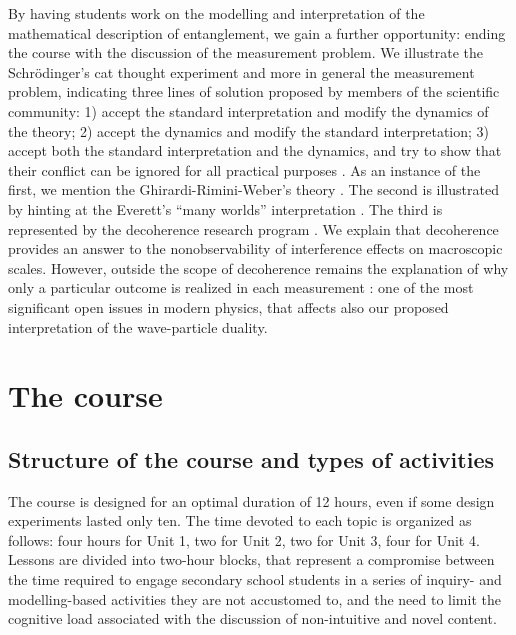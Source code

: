 \documentclass[twocolumn,secnumarabic,amssymb, nobibnotes, aps, prd, nofootinbib]{revtex4-2}
\begin{document}
By having students work on the modelling and interpretation of the mathematical description of entanglement, we gain a further opportunity: ending the course with the discussion of the measurement problem. We illustrate the Schr\"{o}dinger's cat thought experiment and more in general the measurement problem,
indicating three lines of solution proposed by members of the scientific community: 1) accept the standard interpretation and modify the dynamics of the theory; 2) accept the dynamics and modify the standard interpretation; 3) accept both the standard interpretation and the dynamics, and try to show that their conflict can be ignored for all practical purposes \cite{Bub1998}.
As an instance of the first, we mention the Ghirardi-Rimini-Weber's theory \cite{Norsen2017}. The second is illustrated by hinting at the Everett's ``many
worlds'' interpretation \cite{Norsen2017}. The third is represented by the decoherence research program \cite{Schlosshauer2007}. We explain that decoherence provides an answer to the nonobservability of interference effects on macroscopic scales. However, outside the scope of decoherence remains the explanation of why only a particular outcome is realized in each measurement \cite{Schlosshauer2007}: one of the most significant open issues in modern physics, that affects also our proposed interpretation of the wave-particle duality.


\section{The course} \label{Sec:4}

\subsection{Structure of the course and types of activities} \label{Sec:4.1}
The course is designed for an optimal duration of 12 hours, even if some design experiments lasted only ten. The time devoted to each topic is organized as follows: four hours for Unit 1, two for Unit 2, two for Unit 3, four for Unit 4. Lessons are divided into two-hour blocks, that represent a compromise between the time required to engage secondary school students in a series of inquiry- and modelling-based activities they are not accustomed to, and the need to limit the cognitive load associated with the discussion of non-intuitive and novel content.
\end{document}
